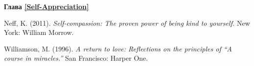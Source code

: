 \begin{thebibliography}{999}
	
	
	\vspace{3ex}
	\textbf{Глава \ref{Self-Appreciation}}
	
	 Neff, K. (2011). \textit{Self-compassion: The proven power of being kind to yourself.} New York: William Morrow.
	
	 Williamson, M. (1996). \textit{A return to love: Reflections on the principles of “A course in miracles.”} San Francisco: Harper One.
	
\end{thebibliography}
